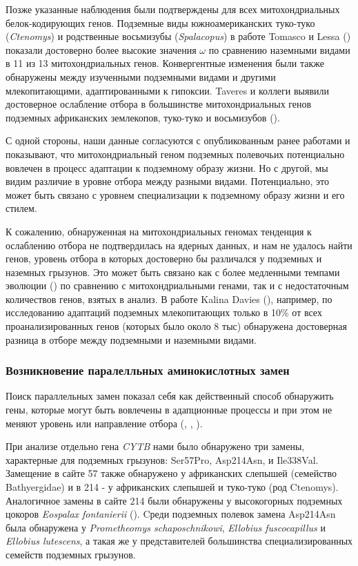 Позже указанные наблюдения были подтверждены для всех митохондриальных белок-кодирующих генов. Подземные виды южноамериканских туко-туко (\textit{Ctenomys}) и родственные восьмизубы (\textit{Spalacopus}) в работе Tomasco и Lessa (\cite{Tomasco2011}) показали достоверно более высокие значения $\omega$ по сравнению наземными видами в 11 из 13 митохондриальных генов. Конвергентные изменения были также обнаружены между изученными подземными видами и другими млекопитающими, адаптированными к гипоксии. Taveres и коллеги выявили достоверное ослабление отбора в большинстве митохондриальных генов подземных африканских землекопов, туко-туко и восьмизубов (\cite{Tavares2018}). 


С одной стороны, наши данные согласуются с опубликованным ранее работами и показывают, что митохондриальный геном подземных полевочьих потенциально вовлечен в процесс адаптации к подземному образу жизни. Но с другой, мы видим различие в уровне отбора между разными видами. Потенциально, это может быть связано с уровнем специализации к подземному образу жизни и его стилем.


К сожалению, обнаруженная на митохондриальных геномах тенденция к ослаблению отбора не подтвердилась на ядерных данных, и нам не удалось найти генов, уровень отбора в которых достоверно бы различался у подземных и наземных грызунов. Это может быть связано как с более медленными темпами эволюции (\cite{Lin2004}) по сравнению с митохондриальными генами, так и с недостаточным количествов генов, взятых в анализ. В работе Kalina Davies (\cite{Davies2018}), например, по исследованию адаптаций подземных млекопитающих только в 10\% от всех проанализированных генов (которых было около 8 тыс) обнаружена достоверная разница в отборе между подземными и наземными видами. 


\subsubsection*{Возникновение паралелльных аминокислотных замен}
Поиск параллельных замен показал себя как действенный способ обнаружить гены, которые могут быть вовлечены в адапционные процессы и при этом не меняют уровень или направление отбора (\cite{Davies2018}, \cite{Zhou2015}, \cite{Sackman2017}). 

При анализе отдельно гена \textit{CYTB} нами было обнаружено три замены, характерные для подземных грызунов: Ser57Pro, Asp214Asn, и Ile338Val. Замещение в сайте 57 также обнаружено у африканских слепышей (семейство Bathyergidae) и в 214 - у африканских слепышей и туко-туко (род Ctenomys). Аналогичное замены в сайте 214 были обнаружены у высокогорных подземных цокоров \textit{Eospalax fontanierii} (\cite{Cooper1993}). Cреди подземных полевок замена Asp214Asn была обнаружена у \textit{Prometheomys schaposchnikowi}, \textit{Ellobius fuscocapillus} и \textit{Ellobius lutescens}, а такая же у представителей большинства специализированных семейств подземных грызунов.

